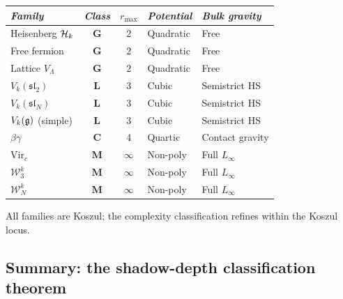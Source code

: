 \begin{theorem}
\label{thm:thqg-grav-landscape}
\ClaimStatusProvedHere
{}
\begin{center}
\small
\renewcommand{\arraystretch}{1.3}
\begin{tabular}{l@{\quad}c@{\quad}c@{\quad}l@{\quad}l}
\toprule
\emph{Family} & \emph{Class} & $r_{\max}$ &
 \emph{Potential} &
 \emph{Bulk gravity} \\
\midrule
Heisenberg $\mathcal{H}_k$ &
 $\mathbf{G}$ & $2$ & Quadratic & Free \\
Free fermion &
 $\mathbf{G}$ & $2$ & Quadratic & Free \\
Lattice $V_\Lambda$ &
 $\mathbf{G}$ & $2$ & Quadratic & Free \\[3pt]
$V_k(\mathfrak{sl}_2)$ &
 $\mathbf{L}$ & $3$ & Cubic & Semistrict HS \\
$V_k(\mathfrak{sl}_N)$ &
 $\mathbf{L}$ & $3$ & Cubic & Semistrict HS \\
$V_k(\mathfrak{g})$ (simple) &
 $\mathbf{L}$ & $3$ & Cubic & Semistrict HS \\[3pt]
$\beta\gamma$ &
 $\mathbf{C}$ & $4$ & Quartic & Contact gravity \\[3pt]
$\mathrm{Vir}_c$ &
 $\mathbf{M}$ & $\infty$ & Non-poly & Full $L_\infty$ \\
$\mathcal{W}_3^k$ &
 $\mathbf{M}$ & $\infty$ & Non-poly & Full $L_\infty$ \\
$\mathcal{W}_N^k$ &
 $\mathbf{M}$ & $\infty$ & Non-poly & Full $L_\infty$ \\
\bottomrule
\end{tabular}
\end{center}
All families are Koszul; the complexity classification refines
within the Koszul locus.
\end{theorem}



\subsection{Summary: the shadow-depth classification theorem}
\label{subsec:thqg-complexity-summary}

